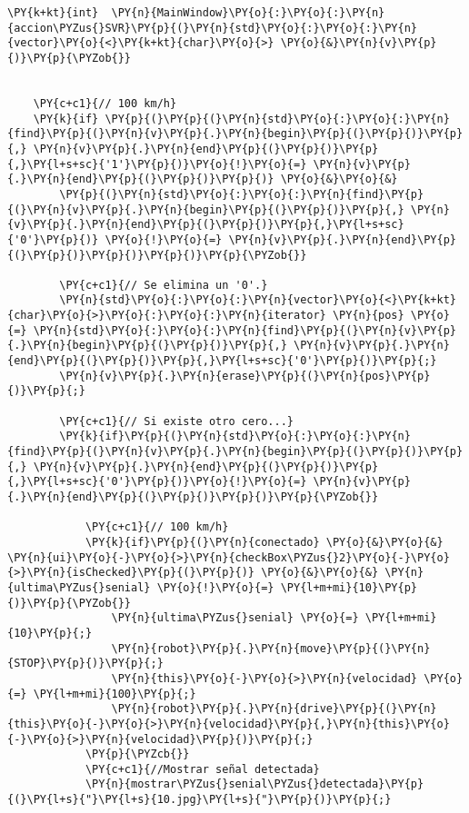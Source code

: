 \begin{Verbatim}[commandchars=\\\{\}]
\PY{k+kt}{int}  \PY{n}{MainWindow}\PY{o}{:}\PY{o}{:}\PY{n}{accion\PYZus{}SVR}\PY{p}{(}\PY{n}{std}\PY{o}{:}\PY{o}{:}\PY{n}{vector}\PY{o}{<}\PY{k+kt}{char}\PY{o}{>} \PY{o}{&}\PY{n}{v}\PY{p}{)}\PY{p}{\PYZob{}}


    \PY{c+c1}{// 100 km/h}
    \PY{k}{if} \PY{p}{(}\PY{p}{(}\PY{n}{std}\PY{o}{:}\PY{o}{:}\PY{n}{find}\PY{p}{(}\PY{n}{v}\PY{p}{.}\PY{n}{begin}\PY{p}{(}\PY{p}{)}\PY{p}{,} \PY{n}{v}\PY{p}{.}\PY{n}{end}\PY{p}{(}\PY{p}{)}\PY{p}{,}\PY{l+s+sc}{'1'}\PY{p}{)}\PY{o}{!}\PY{o}{=} \PY{n}{v}\PY{p}{.}\PY{n}{end}\PY{p}{(}\PY{p}{)}\PY{p}{)} \PY{o}{&}\PY{o}{&}
        \PY{p}{(}\PY{n}{std}\PY{o}{:}\PY{o}{:}\PY{n}{find}\PY{p}{(}\PY{n}{v}\PY{p}{.}\PY{n}{begin}\PY{p}{(}\PY{p}{)}\PY{p}{,} \PY{n}{v}\PY{p}{.}\PY{n}{end}\PY{p}{(}\PY{p}{)}\PY{p}{,}\PY{l+s+sc}{'0'}\PY{p}{)} \PY{o}{!}\PY{o}{=} \PY{n}{v}\PY{p}{.}\PY{n}{end}\PY{p}{(}\PY{p}{)}\PY{p}{)}\PY{p}{)}\PY{p}{\PYZob{}}

        \PY{c+c1}{// Se elimina un '0'.}
        \PY{n}{std}\PY{o}{:}\PY{o}{:}\PY{n}{vector}\PY{o}{<}\PY{k+kt}{char}\PY{o}{>}\PY{o}{:}\PY{o}{:}\PY{n}{iterator} \PY{n}{pos} \PY{o}{=} \PY{n}{std}\PY{o}{:}\PY{o}{:}\PY{n}{find}\PY{p}{(}\PY{n}{v}\PY{p}{.}\PY{n}{begin}\PY{p}{(}\PY{p}{)}\PY{p}{,} \PY{n}{v}\PY{p}{.}\PY{n}{end}\PY{p}{(}\PY{p}{)}\PY{p}{,}\PY{l+s+sc}{'0'}\PY{p}{)}\PY{p}{;}
        \PY{n}{v}\PY{p}{.}\PY{n}{erase}\PY{p}{(}\PY{n}{pos}\PY{p}{)}\PY{p}{;}

        \PY{c+c1}{// Si existe otro cero...}
        \PY{k}{if}\PY{p}{(}\PY{n}{std}\PY{o}{:}\PY{o}{:}\PY{n}{find}\PY{p}{(}\PY{n}{v}\PY{p}{.}\PY{n}{begin}\PY{p}{(}\PY{p}{)}\PY{p}{,} \PY{n}{v}\PY{p}{.}\PY{n}{end}\PY{p}{(}\PY{p}{)}\PY{p}{,}\PY{l+s+sc}{'0'}\PY{p}{)}\PY{o}{!}\PY{o}{=} \PY{n}{v}\PY{p}{.}\PY{n}{end}\PY{p}{(}\PY{p}{)}\PY{p}{)}\PY{p}{\PYZob{}}

            \PY{c+c1}{// 100 km/h}
            \PY{k}{if}\PY{p}{(}\PY{n}{conectado} \PY{o}{&}\PY{o}{&} \PY{n}{ui}\PY{o}{-}\PY{o}{>}\PY{n}{checkBox\PYZus{}2}\PY{o}{-}\PY{o}{>}\PY{n}{isChecked}\PY{p}{(}\PY{p}{)} \PY{o}{&}\PY{o}{&} \PY{n}{ultima\PYZus{}senial} \PY{o}{!}\PY{o}{=} \PY{l+m+mi}{10}\PY{p}{)}\PY{p}{\PYZob{}}
                \PY{n}{ultima\PYZus{}senial} \PY{o}{=} \PY{l+m+mi}{10}\PY{p}{;}
                \PY{n}{robot}\PY{p}{.}\PY{n}{move}\PY{p}{(}\PY{n}{STOP}\PY{p}{)}\PY{p}{;}
                \PY{n}{this}\PY{o}{-}\PY{o}{>}\PY{n}{velocidad} \PY{o}{=} \PY{l+m+mi}{100}\PY{p}{;}
                \PY{n}{robot}\PY{p}{.}\PY{n}{drive}\PY{p}{(}\PY{n}{this}\PY{o}{-}\PY{o}{>}\PY{n}{velocidad}\PY{p}{,}\PY{n}{this}\PY{o}{-}\PY{o}{>}\PY{n}{velocidad}\PY{p}{)}\PY{p}{;}
            \PY{p}{\PYZcb{}}
            \PY{c+c1}{//Mostrar señal detectada}
            \PY{n}{mostrar\PYZus{}senial\PYZus{}detectada}\PY{p}{(}\PY{l+s}{"}\PY{l+s}{10.jpg}\PY{l+s}{"}\PY{p}{)}\PY{p}{;}


\end{Verbatim}
